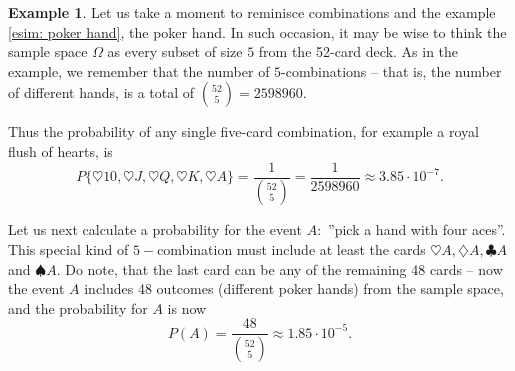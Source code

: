 \documentclass[12pt,a4paper,leqno]{report}
\theoremstyle{plain}
\theoremstyle{definition}
\newtheorem{esim}[equation]{Example}
\begin{document}
\begin{esim}
Let us take a moment to reminisce combinations and the example \ref{esim: poker hand}, the poker hand. In such occasion, it may be wise to think the sample space $\Omega$ as every subset of size $5$ from the 52-card deck. As in the example, we remember that the number of $5$-combinations -- that is, the number of different hands, is a total of $\binom{52}{5} = 2598960$.

Thus the probability of any single five-card combination, for example a royal flush of hearts, is
\[
P\{\heartsuit 10, \heartsuit J, \heartsuit Q, \heartsuit K, \heartsuit A\} = \frac{1}{\binom{52}{5}} = \frac{1}{2598960} \approx 3.85 \cdot 10^{-7}. 
\]

Let us next calculate a probability for the event $A:$ ''pick a hand with four aces''. This special kind of $5-$combination must include at least the cards $\heartsuit A,\diamondsuit A, \clubsuit A$ and $\spadesuit A$. Do note, that the last card can be any of the remaining 48 cards -- now the event $A$ includes 48 outcomes (different poker hands) from the sample space, and the probability for $A$ is now
\[
P(A) = \frac{48}{\binom{52}{5}} \approx 	1.85 \cdot 10^{-5}.
\]
\end{esim}
\end{document}
